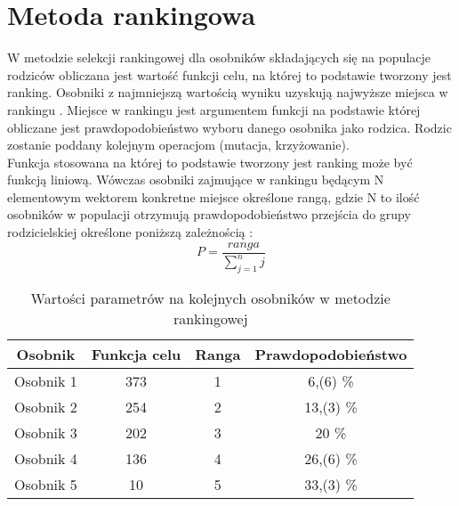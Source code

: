 
\section{Metoda rankingowa}\label{sec:kompilacja}


W metodzie selekcji rankingowej dla osobników składających się na populacje rodziców obliczana jest wartość funkcji celu, na której to podstawie tworzony jest ranking. Osobniki z najmniejszą wartością wyniku uzyskują najwyższe miejsca w rankingu \cite{selekcje}. Miejsce w rankingu jest argumentem funkcji na podstawie której obliczane jest prawdopodobieństwo wyboru danego osobnika jako rodzica. Rodzic zostanie poddany kolejnym operacjom (mutacja, krzyżowanie).\\
 Funkcja stosowana na której to podstawie tworzony jest ranking może być funkcją liniową. Wówczas osobniki zajmujące w rankingu będącym N elementowym wektorem konkretne miejsce określone rangą, gdzie N to ilość osobników w populacji otrzymują prawdopodobieństwo przejścia do grupy rodzicielskiej określone poniższą zależnością \cite{Lam92}:
$$
P = \frac{ranga}{\sum_{j=1}^{n}j}
$$

\begin{table}[h!]
\begin{center}
\begin{tabular}{|c|c|c|c|}
\hline
\textbf{Osobnik}  & \textbf{Funkcja celu} & \textbf{Ranga} & \textbf{Prawdopodobieństwo}\\
\hline
Osobnik 1 & 373 & 1 & 6,(6) \% \\
\hline
Osobnik 2 &254 & 2  & 13,(3)  \% \\
\hline
Osobnik 3 & 202 & 3 & 20  \% \\
\hline
Osobnik 4 & 136 & 4 & 26,(6)  \% \\
\hline
Osobnik 5 & 10 & 5 & 33,(3)  \% \\
\hline
\end{tabular}
\caption{Wartości parametrów na kolejnych osobników w metodzie rankingowej}
\end{center}
\end{table}

\vspace{0,4cm}

